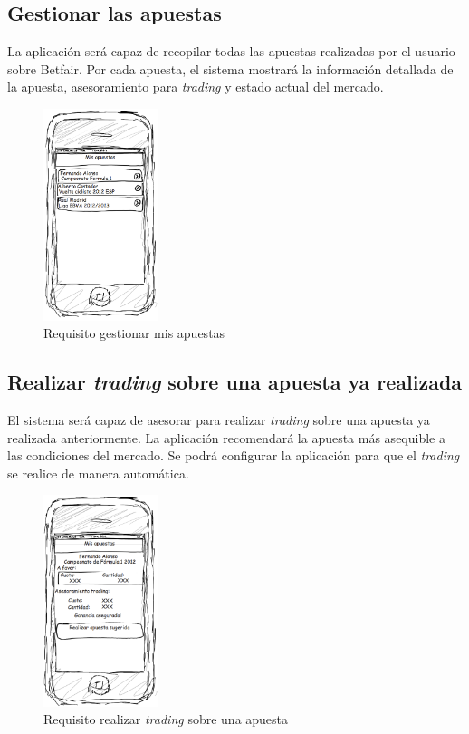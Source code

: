 \subsection{Gestionar las apuestas}
La aplicación será capaz de recopilar todas las apuestas realizadas por el usuario sobre Betfair. Por cada apuesta, el sistema mostrará la información detallada de la apuesta, asesoramiento para \emph{trading} y estado actual del mercado.
\begin{figure}[H]
    \centering
       \includegraphics[width=0.3\textwidth]{./images/req_misapuestas.png}
     \caption{Requisito gestionar mis apuestas}
   \label{fig:Requisito gestionar mis apuestas}
\end{figure}
\subsection{Realizar \emph{trading} sobre una apuesta ya realizada}
El sistema será capaz de asesorar para realizar \emph{trading} sobre una apuesta ya realizada anteriormente. La aplicación recomendará la apuesta más asequible a las condiciones del mercado. Se  podrá configurar la aplicación para que el \emph{trading} se realice de manera automática.
\begin{figure}[H]
    \centering
       \includegraphics[width=0.3\textwidth]{./images/req_trading.png}
     \caption{Requisito realizar \emph{trading} sobre una apuesta}
   \label{fig:Requisito trading}
\end{figure}

